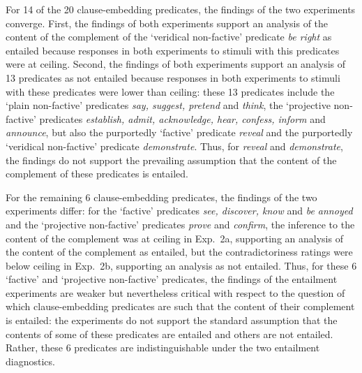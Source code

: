 \documentclass[11pt,fleqn]{article}
\newcommand{\6}{\mbox{$[\hspace*{-.6mm}[$}}
\newcommand{\9}{\mbox{$]\hspace*{-.6mm}]$}}
\begin{document}
{For 14 of the 20 clause-embedding predicates, the findings of the two experiments converge. First, the findings of both experiments support an analysis of the content of the complement of the `veridical non-factive' predicate {\em be right} as entailed because responses in both experiments to stimuli with this predicates were at ceiling. Second, the findings of both experiments support an analysis of 13 predicates as not entailed because responses in both experiments to stimuli with these predicates were lower than ceiling:  these 13 predicates include the `plain non-factive' predicates {\em say, suggest, pretend} and {\em think}, the `projective non-factive' predicates {\em establish, admit, acknowledge, hear, confess, inform} and {\em announce}, but also the purportedly `factive' predicate {\em reveal} and the purportedly `veridical non-factive' predicate {\em demonstrate}. Thus, for {\em reveal} and {\em demonstrate}, the findings do not support the prevailing assumption that the content of the complement of these predicates is entailed. 

For the remaining 6 clause-embedding predicates, the findings of the two experiments differ: for the `factive' predicates  {\em see, discover, know} and {\em be annoyed}  and the `projective non-factive' predicates {\em prove} and {\em confirm}, the inference to the content of the complement was at ceiling in Exp.~2a, supporting an analysis of the content of the complement as entailed, but the contradictoriness ratings were below ceiling in Exp.~2b, supporting an analysis as not entailed. Thus, for these 6 `factive' and `projective non-factive' predicates, the findings of the entailment experiments are weaker but nevertheless critical with respect to the question of which clause-embedding predicates are such that the content of their complement is entailed: the experiments do not support the standard assumption that the contents of some of these predicates are entailed and others are not entailed. Rather, these 6 predicates are indistinguishable under the two entailment diagnostics.

}
\end{document}
